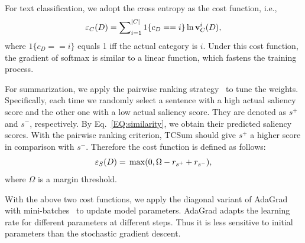 \documentclass[letterpaper]{article}
\begin{document}
For text classification, we adopt the cross entropy as the cost function, i.e.,
\begin{equation}
{\varepsilon _C}(D) = \sum\nolimits_{i = 1}^{|C|} {1\{ c_D =  = i\} \ln {\bf{v}}_C^i(D)},
\end{equation}
where ${1\{ c_D =  = i\} }$ equals 1 iff the actual category is $i$.
Under this cost function, the gradient of softmax is similar to a linear function, which fastens the training process.

For summarization, we apply the pairwise ranking strategy~\cite{Collobert2011}  to tune the weights.
Specifically, each time we randomly select a sentence with a high actual saliency score and the other one with a low actual saliency score.
They are denoted as $s^+$ and $s^-$, respectively.
By Eq.~\ref{EQ:similarity}, we obtain their predicted saliency scores.
With the pairwise ranking criterion, TCSum should give $s^+$ a higher score in comparison with $s^-$.
Therefore the cost function is defined as follows:
\begin{equation} \label{eq:cost}
{\varepsilon _S}(D) = {\rm{ }}\max (0,\Omega  - r_{{s^ + }} + r_{{s^ - }}),
\end{equation}
where $\Omega$ is a margin threshold.

With the above two cost functions, we apply the diagonal variant of AdaGrad with mini-batches~\cite{duchi2011adaptive} to update model parameters.
AdaGrad adapts the learning rate for different parameters at different steps.
Thus it is less sensitive to initial parameters than the stochastic gradient descent.
\end{document}
